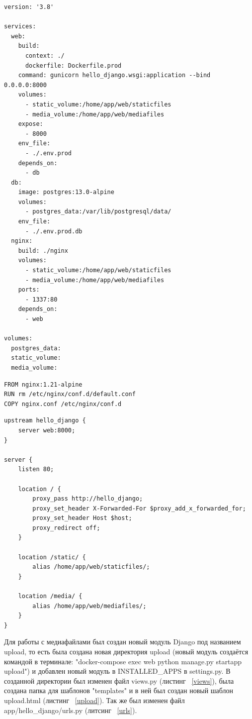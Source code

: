 \begin{lstlisting}[frame=single, label={docker-compose.prod}, caption={docker-compose.prod.yml}, language={docker-compose}] 
version: '3.8'

services:
  web:
    build:
      context: ./
      dockerfile: Dockerfile.prod
    command: gunicorn hello_django.wsgi:application --bind 0.0.0.0:8000
    volumes:
      - static_volume:/home/app/web/staticfiles
      - media_volume:/home/app/web/mediafiles
    expose:
      - 8000
    env_file:
      - ./.env.prod
    depends_on:
      - db
  db:
    image: postgres:13.0-alpine
    volumes:
      - postgres_data:/var/lib/postgresql/data/
    env_file:
      - ./.env.prod.db
  nginx:
    build: ./nginx
    volumes:
      - static_volume:/home/app/web/staticfiles
      - media_volume:/home/app/web/mediafiles
    ports:
      - 1337:80
    depends_on:
      - web

volumes:
  postgres_data:
  static_volume:
  media_volume:
\end{lstlisting}

\begin{lstlisting}[frame=single, label={dockerfile_nginx}, caption={Dockerfile в директории nginx}, language={docker}] 
FROM nginx:1.21-alpine
RUN rm /etc/nginx/conf.d/default.conf
COPY nginx.conf /etc/nginx/conf.d
\end{lstlisting}

\begin{lstlisting}[frame=single, label={nginx.conf}, caption={nginx.conf}, language={nginx}] 
upstream hello_django {
    server web:8000;
}

server {
    listen 80;

    location / {
        proxy_pass http://hello_django;
        proxy_set_header X-Forwarded-For $proxy_add_x_forwarded_for;
        proxy_set_header Host $host;
        proxy_redirect off;
    }

    location /static/ {
        alias /home/app/web/staticfiles/;
    }

    location /media/ {
        alias /home/app/web/mediafiles/;
    }
}
\end{lstlisting}

	Для работы с медиафайлами был создан новый модуль \textsf{Django} под названием \textsf{upload}, то есть была создана новая директория \textsf{upload} (новый модуль создаётся командой в терминале: "\textsf{docker-compose exec web python manage.py startapp upload}") и добавлен новый модуль в \textsf{INSTALLED_APPS} в \textsf{settings.py}.
	В созданной директории был изменен файл views.py (листинг  ~\ref{views}), была создана папка для шаблонов "templates" и в ней был создан новый шаблон \textsf{upload.html} (листинг ~\ref{upload}). Так же был изменен файл \textsf{app/hello_django/urls.py} (литсинг ~\ref{urls}).

